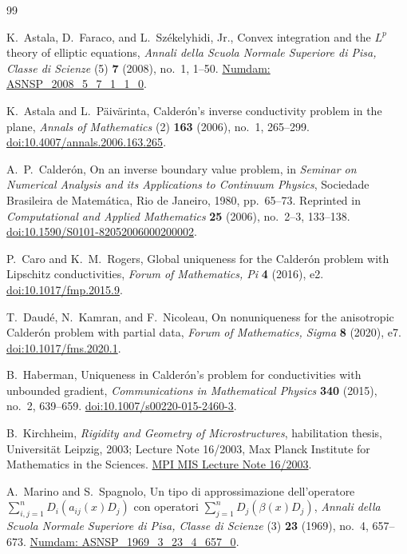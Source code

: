 \begin{thebibliography}{99}

K.~Astala, D.~Faraco, and L.~Sz\'ekelyhidi, Jr.,
Convex integration and the $L^p$ theory of elliptic equations,
\emph{Annali della Scuola Normale Superiore di Pisa,
Classe di Scienze} (5) \textbf{7} (2008), no.~1, 1--50.
\href{https://www.numdam.org/item/ASNSP_2008_5_7_1_1_0/}
{Numdam: ASNSP\_2008\_5\_7\_1\_1\_0}.

K.~Astala and L.~P\"aiv\"arinta,
Calder\'on's inverse conductivity problem in the plane,
\emph{Annals of Mathematics} (2) \textbf{163} (2006), no.~1, 265--299.
\href{https://doi.org/10.4007/annals.2006.163.265}
{doi:10.4007/annals.2006.163.265}.

A.~P.~Calder\'on,
On an inverse boundary value problem,
in \emph{Seminar on Numerical Analysis and its Applications to Continuum
Physics}, Sociedade Brasileira de Matem\'atica, Rio de Janeiro, 1980,
pp.~65--73.
Reprinted in \emph{Computational and Applied Mathematics}
\textbf{25} (2006), no.~2--3, 133--138.
\href{https://doi.org/10.1590/S0101-82052006000200002}
{doi:10.1590/S0101-82052006000200002}.

P.~Caro and K.~M.~Rogers,
Global uniqueness for the Calder\'on problem with Lipschitz
conductivities,
\emph{Forum of Mathematics, Pi} \textbf{4} (2016), e2.
\href{https://doi.org/10.1017/fmp.2015.9}{doi:10.1017/fmp.2015.9}.

T.~Daud\'e, N.~Kamran, and F.~Nicoleau,
On nonuniqueness for the anisotropic Calder\'on problem with partial data,
\emph{Forum of Mathematics, Sigma} \textbf{8} (2020), e7.
\href{https://doi.org/10.1017/fms.2020.1}{doi:10.1017/fms.2020.1}.

B.~Haberman,
Uniqueness in Calder\'on's problem for conductivities with unbounded
gradient,
\emph{Communications in Mathematical Physics}
\textbf{340} (2015), no.~2, 639--659.
\href{https://doi.org/10.1007/s00220-015-2460-3}
{doi:10.1007/s00220-015-2460-3}.

B.~Kirchheim,
\emph{Rigidity and Geometry of Microstructures},
habilitation thesis, Universit\"at Leipzig, 2003;
Lecture Note 16/2003, Max Planck Institute for Mathematics in the Sciences.
\href{https://www.mis.mpg.de/publications/preprint-repository/lecture_note/2003/issue-16}
{MPI MIS Lecture Note 16/2003}.

A.~Marino and S.~Spagnolo,
Un tipo di approssimazione dell'operatore
$\sum_{i,j=1}^{n}D_i(a_{ij}(x)D_j)$ con operatori
$\sum_{j=1}^{n}D_j(\beta(x)D_j)$,
\emph{Annali della Scuola Normale Superiore di Pisa,
Classe di Scienze} (3) \textbf{23} (1969), no.~4, 657--673.
\href{https://www.numdam.org/item/ASNSP_1969_3_23_4_657_0/}
{Numdam: ASNSP\_1969\_3\_23\_4\_657\_0}.


\end{thebibliography}
